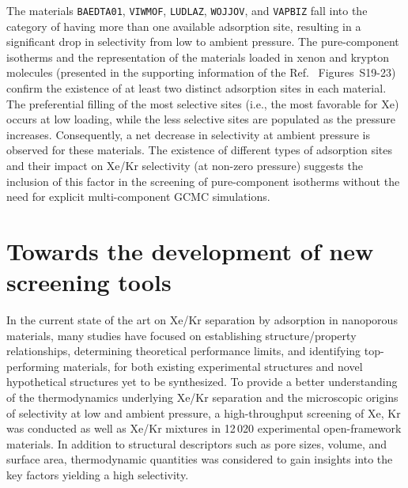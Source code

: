 \documentclass[main.tex]{subfiles}
\begin{document}
The materials \texttt{BAEDTA01}, \texttt{VIWMOF}, \texttt{LUDLAZ}, \texttt{WOJJOV}, and \texttt{VAPBIZ} fall into the category of having more than one available adsorption site, resulting in a significant drop in selectivity from low to ambient pressure. The pure-component isotherms and the representation of the materials loaded in xenon and krypton molecules (presented in the supporting information of the Ref.~\cite{Ren_2021} Figures~S19-23) confirm the existence of at least two distinct adsorption sites in each material. The preferential filling of the most selective sites (i.e., the most favorable for Xe) occurs at low loading, while the less selective sites are populated as the pressure increases. Consequently, a net decrease in selectivity at ambient pressure is observed for these materials. The existence of different types of adsorption sites and their impact on Xe/Kr selectivity (at non-zero pressure) suggests the inclusion of this factor in the screening of pure-component isotherms without the need for explicit multi-component GCMC simulations.

\section{Towards the development of new screening tools}

In the current state of the art on Xe/Kr separation by adsorption in nanoporous materials, many studies have focused on establishing structure/property relationships, determining theoretical performance limits, and identifying top-performing materials, for both existing experimental structures and novel hypothetical structures yet to be synthesized. To provide a better understanding of the thermodynamics underlying Xe/Kr separation and the microscopic origins of selectivity at low and ambient pressure, a high-throughput screening of Xe, Kr was conducted as well as Xe/Kr mixtures in 12\,020 experimental open-framework materials. In addition to structural descriptors such as pore sizes, volume, and surface area, thermodynamic quantities was considered to gain insights into the key factors yielding a high selectivity.
\end{document}
